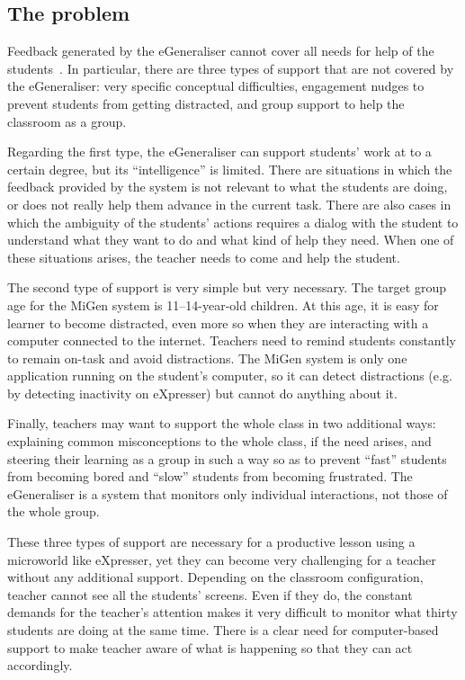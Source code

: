 \subsection{The problem}
\label{sec:problem}

Feedback generated by the eGeneraliser cannot cover all needs for help
of the students~\cite{ISmetrics}. In particular, there are three types
of support that are not covered by the eGeneraliser: very specific
conceptual difficulties, engagement nudges to prevent students from
getting distracted, and group support to help the classroom as a
group.

Regarding the first type, the eGeneraliser can support students' work
at to a certain degree, but its ``intelligence'' is limited. There are
situations in which the feedback provided by the system is not
relevant to what the students are doing, or does not really help them
advance in the current task. There are also cases in which the
ambiguity of the students' actions requires a dialog with the student
to understand what they want to do and what kind of help they
need. When one of these situations arises, the teacher needs to come and
help the student. 

The second type of support is very simple but very necessary. The
target group age for the MiGen system is 11--14-year-old children. At
this age, it is easy for learner to become distracted, even more so when
they are interacting with a computer connected to the
internet. Teachers need to remind students constantly to remain
on-task and avoid distractions. The MiGen system is only one
application running on the student's computer, so it can detect distractions
(e.g. by detecting inactivity on eXpresser) but cannot do anything
about it. 

Finally, teachers may want to support the whole class in two additional ways:
explaining common misconceptions to the whole class, if the need
arises, and steering their learning as a group in such a way so as to prevent ``fast''
students from becoming bored and ``slow'' students from becoming
frustrated. The eGeneraliser is a system that monitors only
individual interactions, not those of the whole group. 

These three types of support are necessary for a productive lesson
using a microworld like eXpresser, yet they can become very
challenging for a teacher without any additional support. Depending on
the classroom configuration, teacher cannot see all the students'
screens. Even if they do, the constant demands for the teacher's attention
makes it very difficult to monitor what thirty students are doing at
the same time. There is a clear need for computer-based support to
make teacher aware of what is happening so that they can act
accordingly. 

